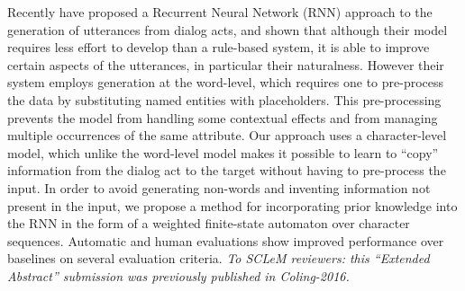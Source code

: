 Recently  have proposed a Recurrent Neural Network (RNN) approach to the generation of utterances from dialog acts, and shown that although their model requires less effort to develop than a rule-based system, it is able to improve certain aspects of the utterances, in particular their naturalness. However their system employs generation at the word-level, which requires one to pre-process the data by substituting named entities with placeholders. This pre-processing prevents the model from handling some contextual effects and from managing multiple occurrences of the same attribute. Our approach uses a character-level model, which unlike the word-level model makes it possible to learn to ``copy'' information from the dialog act to the target without having to pre-process the input. In order to avoid generating non-words and inventing information not present in the input, we propose a method for incorporating prior knowledge into the RNN in the form of a weighted finite-state automaton over character sequences. Automatic and human evaluations show improved performance over baselines on several evaluation criteria. \emph{To SCLeM reviewers: this ``Extended Abstract'' submission was previously published in Coling-2016.}
